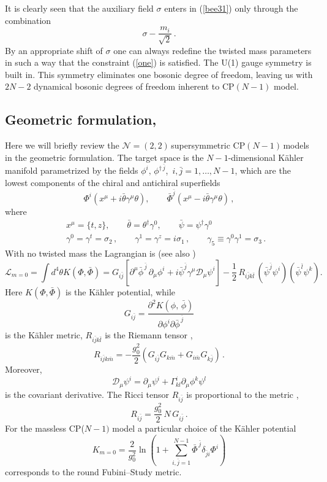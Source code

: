 \documentclass[epsfig,12pt]{article}
\def\beq{\begin{equation}}
\def\eeq{\end{equation}}
\def\beqn{\begin{eqnarray}}
\def\eeqn{\end{eqnarray}}
\newcommand{\ntt}{${\mathcal N}=(2,2)\,$}
\newcommand{\cpn}{CP$(N-1)\,$}
\newcommand{\cell}{{\mathcal L}}
\newcommand{\cde}{{\mathcal D}}
\def\beqn{\begin{eqnarray}}
\def\eeqn{\end{eqnarray}}
\def\beq{\begin{equation}}
\def\eeq{\end{equation}}
\begin{document}
It is clearly seen that the auxiliary field $\sigma$
enters in (\ref{bee31}) only through the  combination
\beq
\sigma -\frac{m_i}{\sqrt 2}\,.
\label{combi}
\eeq
By an appropriate shift of $\sigma$
one can always redefine the twisted mass parameters in such a way that the constraint
(\ref{one}) is satisfied.
 The U(1) gauge symmetry is built in. This symmetry eliminates one bosonic degree of freedom, leaving us with $2N-2$ dynamical bosonic degrees of freedom inherent to CP$(N-1)$ model.



\subsection{Geometric formulation,  }

Here we will  briefly review the \ntt supersymmetric \cpn models in the
geometric formulation. 
The target space is the $N-1$-dimensional K\"ahler manifold 
parametrized by the fields $\phi^{i},\,\phi^{\dagger\,\bar j}$, $\,i,\bar j=1,\ldots,N-1$,
which are the lowest components of the chiral and antichiral superfields 
\beq
\Phi^{i}(x^{\mu}+i\bar \theta \gamma^{\mu} \theta),\qquad \bar\Phi^{\bar j}(x^{\mu}-i\bar \theta \gamma^{\mu} \theta)\,,
\eeq
where
\beqn
&&
x^{\mu}=\{t,z\},\qquad \bar \theta=\theta^{\dagger}\gamma^{0},\qquad \bar \psi=\psi^{\dagger}\gamma^{0}
\nonumber
\\[2mm]
&&\gamma^{0}=\gamma^t=\sigma_2\,,\qquad \gamma^{1}=\gamma^z = i\sigma_1\,,\qquad \gamma_{5} 
\equiv\gamma^0\gamma^1 = \sigma_3\,.
\eeqn
With no twisted mass the Lagrangian  is \cite{Bruno}
(see also \cite{WessBagger})
\begin{equation}
\label{eq:kinetic}
{\cell}_{m=0}= \int d^{4 }\theta K(\Phi, \bar\Phi)
=G_{i\bar j} \left[\partial^\mu \bar\phi^{\,\bar j}\, \partial_\mu\phi^{i}
+i\bar \psi^{\bar j} \gamma^{\mu} \cde_{\mu}\psi^{i}\right]
-\frac{1}{2}\,R_{i\bar jk\bar l}\,(\bar\psi^{\bar j}\psi^{i})(\bar\psi^{\bar l}\psi^{k}).
\end{equation}
Here $K(\Phi, \bar\Phi)$ is the K\"ahler potential, while
$$
G_{i\bar j}=\frac{\partial^{2} K(\phi,\,\bar\phi)}{\partial \phi^{i}\partial \bar\phi^{\,\bar j}}
$$
 is the K\"ahler metric,
$R_{i\bar jk\bar l}$ is the Riemann tensor \cite{Helgason}, 
\beq
R_{i\bar{j} k\bar{m}} = - \frac{g_0^2}{2}\left(G_{i\bar{j}}G_{k\bar{m}} +
G_{i\bar{m}}G_{k\bar{j}}
\right)\,.
\label{640}
\eeq
Moreover,
$$ \cde_{\mu}\psi^{i}=
\partial_{\mu}\psi^{i}+\Gamma^{i}_{kl}\partial_{\mu} \phi^{k}\psi^{l}
$$
is the covariant derivative.
The Ricci tensor $R_{i\bar j}$ is proportional to the metric \cite{Helgason},
\beq
\label{eq:RG}
R_{i\bar{j}} = \frac{g_{0}^2}{2}\,  N \, G_{i\bar{j}}\,.
\eeq
For the massless CP($N\!-\!1)$ model 
a particular choice of the K\"ahler potential
\begin{equation}
\label{eq:kahler}
K_{m=0}=\frac{2}{g_{0}^{2}}\ln\left(1+\sum_{i,\bar j=1}^{ N-1}\bar\Phi^{\,\bar j}\delta_{\bar j i}\Phi^{i}\right)
\end{equation}
corresponds to the round Fubini--Study metric.
\end{document}
